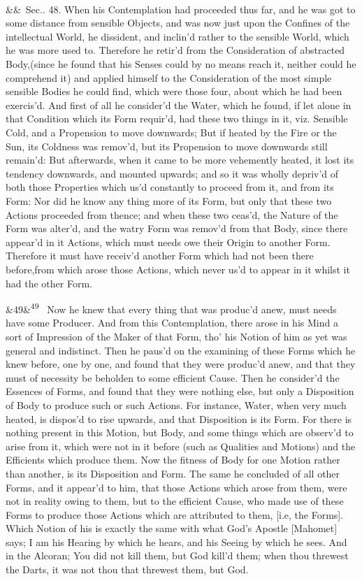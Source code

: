 \documentclass[12pt]{article}
\newcommand{\para}[1][]{\par\noindent\ifx&#1&\else\textsuperscript{\footnotesize #1}~\fi}
\begin{document}
\para Sec.. 48. When his Contemplation had proceeded thus far, and he was got to some distance from sensible Objects, and was now just upon the Confines of the intellectual World, he dissident, and inclin'd rather to the sensible World, which he was more used to. Therefore he retir'd from the Consideration of abstracted Body,(since he found that his Senses could by no means reach it, neither could he comprehend it) and applied himself to the Consideration of the most simple sensible Bodies he could find, which were those four, about which he had been exercis'd. And first of all he consider'd the Water, which he found, if let alone in that Condition which its Form requir'd, had these two things in it, viz. Sensible Cold, and a Propension to move downwards; But if heated by the Fire or the Sun, its Coldness was remov'd, but its Propension to move downwards still remain'd: But afterwards, when it came to be more vehemently heated, it lost its tendency downwards, and mounted upwards; and so it was wholly depriv'd of both those Properties which us'd constantly to proceed from it, and from its Form: Nor did he know any thing more of its Form, but only that these two Actions proceeded from thence; and when these two ceas'd, the Nature of the Form was alter'd, and the watry Form was remov'd from that Body, since there appear'd in it Actions, which must needs owe their Origin to another Form. Therefore it must have receiv'd another Form which had not been there before,from which arose those Actions, which never us'd to appear in it whilst it had the other Form.

\para[49] Now he knew that every thing that was produc'd anew, must needs have some Producer. And from this Contemplation, there arose in his Mind a sort of Impression of the Maker of that Form, tho' his Notion of him as yet was general and indistinct. Then he paus'd on the examining of these Forms which he knew before, one by one, and found that they were produc'd anew, and that they must of necessity be beholden to some efficient Cause. Then he consider'd the Essences of Forms, and found that they were nothing else, but only a Disposition of Body to produce such or such Actions. For instance, Water, when very much heated, is dispos'd to rise upwards, and that Disposition is its Form. For there is nothing present in this Motion, but Body, and some things which are observ'd to arise from it, which were not in it before (such as Qualities and Motions) and the Efficients which produce them. Now the fitness of Body for one Motion rather than another, is its Disposition and Form. The same he concluded of all other Forms, and it appear'd to him, that those Actions which arose from them, were not in reality owing to them, but to the efficient Cause, who made use of these Forms to produce those Actions which are attributed to them, [i.e, the Forms]. Which Notion of his is exactly the same with what God's Apostle [Mahomet] says; I am his Hearing by which he hears, and his Seeing by which he sees. And in the Alcoran; You did not kill them, but God kill'd them; when thou threwest the Darts, it was not thou that threwest them, but God.
\end{document}
